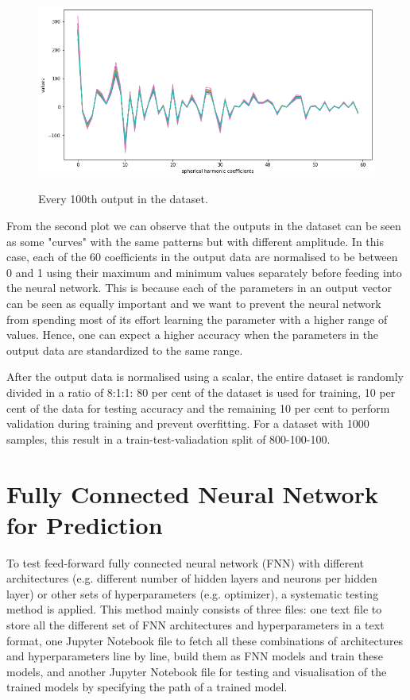 \begin{figure}[H]
    \centering
    \caption{Every 100th output in the dataset.}
    \includegraphics[scale=0.5]{figures/geoid_images/Geoid_sample_output.png}
    \label{figure:geoid_output}
\end{figure}

From the second plot we can observe that the outputs in the dataset can be seen as some "curves" with the same patterns but with different amplitude. In this case, each of the 60 coefficients in the output data are normalised to be between 0 and 1 using their maximum and minimum values separately before feeding into the neural network. This is because each of the parameters in an output vector can be seen as equally important and we want to prevent the neural network from spending most of its effort learning the parameter with a higher range of values. Hence, one can expect a higher accuracy when the parameters in the output data are standardized to the same range.

After the output data is normalised using a scalar, the entire dataset is randomly divided in a ratio of 8:1:1: 80 per cent of the dataset is used for training, 10 per cent of the data for testing accuracy and the remaining 10 per cent to perform validation during training and prevent overfitting. For a dataset with 1000 samples, this result in a train-test-valiadation split of 800-100-100.


\section{Fully Connected Neural Network for Prediction}

To test feed-forward fully connected neural network (FNN) with different architectures (e.g. different number of hidden layers and neurons per hidden layer) or other sets of hyperparameters (e.g. optimizer), a systematic testing method is applied. This method mainly consists of three files: one text file to store all the different set of FNN architectures and hyperparameters in a text format, one Jupyter Notebook file to fetch all these combinations of architectures and hyperparameters line by line, build them as FNN models and train these models, and another Jupyter Notebook file for testing and visualisation of the trained models by specifying the path of a trained model.

